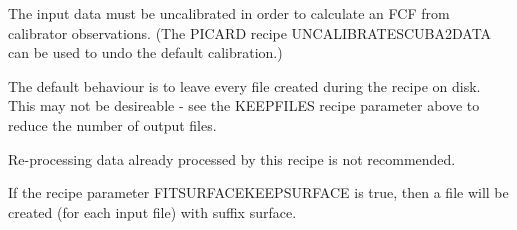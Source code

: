 \documentclass[twoside,11pt]{article}
\renewcommand{\_}{\texttt{\symbol{95}}}
\newcommand{\sstitem}{\item}
\newcommand{\sstitem}{\item}
\begin{document}
{{{         \sstitem
         The input data must be uncalibrated in order to calculate an
         FCF from calibrator observations. (The PICARD recipe
         UNCALIBRATE\_SCUBA2\_DATA can be used to undo the default
         calibration.)

         \sstitem
         The default behaviour is to leave every file created during the
         recipe on disk. This may not be desireable - see the KEEPFILES
         recipe parameter above to reduce the number of output files.

         \sstitem
         Re-processing data already processed by this recipe is not
         recommended.

         \sstitem
         If the recipe parameter FITSURFACE\_KEEPSURFACE is true, then a
         file will be created (for each input file) with suffix \_surface.

}}}
\end{document}
